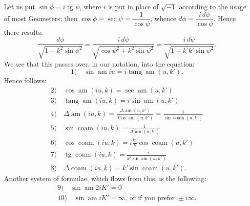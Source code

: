\documentclass{article}
\begin{document}
Let us put $\sin\phi=i\operatorname{tg}\psi$, where $i$ is put in place of $\sqrt{-1}$ according to the usage of most Geometers; then $\cos\phi=\sec\psi=\dfrac{1}{\cos\psi}$, whence $d\phi=\dfrac{i\,d\psi}{\cos\psi}$. Hence there results:
\[
\frac{d\phi}{\sqrt{1-k^{2}\sin\phi^{2}}}=\frac{i\,d\psi}{\sqrt{\cos\psi^{2}+k^{2}\sin\psi^{2}}}=\frac{i\,d\psi}{\sqrt{1-k'k'\sin\psi^{2}}}.
\]
We see that this passes over, in our notation, into the equation:
\[
\text{1)}\quad\sin\operatorname{am}iu=i\operatorname{tang}\operatorname{am}(u,k').
\]
Hence follows:
\[
\begin{gathered}
\text{2)}\quad\cos\operatorname{am}(iu,k)=\sec\operatorname{am}(u,k')\\
\text{3)}\quad\operatorname{tang}\operatorname{am}(iu,k)=i\sin\operatorname{am}(u,k')\\
\text{4)}\quad\Delta\operatorname{am}(iu,k)=\frac{\Delta\operatorname{am}(u,k')}{\operatorname{Cos}\operatorname{am}(u,k')}=\frac{1}{\sin\operatorname{coam}(u,k')}\\
\text{5)}\quad\sin\operatorname{coam}(iu,k)=\frac{1}{\Delta\operatorname{am}(u,k')}\\
\text{6)}\quad\cos\operatorname{coam}(iu,k)=i\frac{k'}{k}\cos\operatorname{coam}(u,k')\\
\text{7)}\quad\operatorname{tg}\operatorname{coam}(iu,k)=\frac{-i}{k'\sin\operatorname{am}(u,k')}\\
\text{8)}\quad\Delta\operatorname{coam}(iu,k)=k'\sin\operatorname{coam}(u,k').
\end{gathered}
\]
Another system of formulae, which flows from this, is the following:
\[
\begin{gathered}
\text{9)}\quad\sin\operatorname{am}2iK'=0\\
\text{10)}\quad\sin\operatorname{am}iK'=\infty,\ \text{or if you prefer }\pm i\infty.
\end{gathered}
\]
\end{document}
